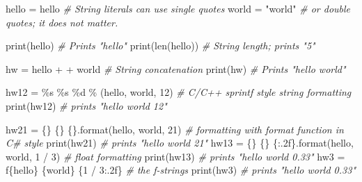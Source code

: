 \documentclass[
]{article}
\newenvironment{Shaded}{}{}
\newcommand{\BuiltInTok}[1]{#1}
\newcommand{\CommentTok}[1]{\textcolor[rgb]{0.38,0.63,0.69}{\textit{#1}}}
\newcommand{\DecValTok}[1]{\textcolor[rgb]{0.25,0.63,0.44}{#1}}
\newcommand{\NormalTok}[1]{#1}
\newcommand{\OperatorTok}[1]{\textcolor[rgb]{0.40,0.40,0.40}{#1}}
\newcommand{\SpecialCharTok}[1]{\textcolor[rgb]{0.25,0.44,0.63}{#1}}
\newcommand{\SpecialStringTok}[1]{\textcolor[rgb]{0.73,0.40,0.53}{#1}}
\newcommand{\StringTok}[1]{\textcolor[rgb]{0.25,0.44,0.63}{#1}}
\begin{document}
\begin{Shaded}
\begin{Highlighting}[]
\NormalTok{hello }\OperatorTok{=} \StringTok{\textquotesingle{}hello\textquotesingle{}}    \CommentTok{\# String literals can use single quotes}
\NormalTok{world }\OperatorTok{=} \StringTok{"world"}    \CommentTok{\# or double quotes; it does not matter.}

\BuiltInTok{print}\NormalTok{(hello)       }\CommentTok{\# Prints "hello"}
\BuiltInTok{print}\NormalTok{(}\BuiltInTok{len}\NormalTok{(hello))  }\CommentTok{\# String length; prints "5"}

\NormalTok{hw }\OperatorTok{=}\NormalTok{ hello }\OperatorTok{+} \StringTok{\textquotesingle{} \textquotesingle{}} \OperatorTok{+}\NormalTok{ world  }\CommentTok{\# String concatenation}
\BuiltInTok{print}\NormalTok{(hw)                 }\CommentTok{\# Prints "hello world"}

\NormalTok{hw12 }\OperatorTok{=} \StringTok{\textquotesingle{}}\SpecialCharTok{\%s}\StringTok{ }\SpecialCharTok{\%s}\StringTok{ }\SpecialCharTok{\%d}\StringTok{\textquotesingle{}} \OperatorTok{\%}\NormalTok{ (hello, world, }\DecValTok{12}\NormalTok{)  }\CommentTok{\# C/C++ sprintf style string formatting}
\BuiltInTok{print}\NormalTok{(hw12)                             }\CommentTok{\# prints "hello world 12"}

\NormalTok{hw21 }\OperatorTok{=} \StringTok{\textquotesingle{}}\SpecialCharTok{\{\}}\StringTok{ }\SpecialCharTok{\{\}}\StringTok{ }\SpecialCharTok{\{\}}\StringTok{\textquotesingle{}}\NormalTok{.}\BuiltInTok{format}\NormalTok{(hello, world, }\DecValTok{21}\NormalTok{)  }\CommentTok{\# formatting with format function in C\# style}
\BuiltInTok{print}\NormalTok{(hw21)                                 }\CommentTok{\# prints "hello world 21"}
\NormalTok{hw13 }\OperatorTok{=} \StringTok{\textquotesingle{}}\SpecialCharTok{\{\}}\StringTok{ }\SpecialCharTok{\{\}}\StringTok{ }\SpecialCharTok{\{:.2f\}}\StringTok{\textquotesingle{}}\NormalTok{.}\BuiltInTok{format}\NormalTok{(hello, world, }\DecValTok{1} \OperatorTok{/} \DecValTok{3}\NormalTok{)  }\CommentTok{\# float formatting}
\BuiltInTok{print}\NormalTok{(hw13)                                        }\CommentTok{\# prints "hello world 0.33"}
\NormalTok{hw3 }\OperatorTok{=} \SpecialStringTok{f\textquotesingle{}}\SpecialCharTok{\{}\NormalTok{hello}\SpecialCharTok{\}}\SpecialStringTok{ }\SpecialCharTok{\{}\NormalTok{world}\SpecialCharTok{\}}\SpecialStringTok{ }\SpecialCharTok{\{}\DecValTok{1} \OperatorTok{/} \DecValTok{3}\SpecialCharTok{:.2f\}}\SpecialStringTok{\textquotesingle{}} \CommentTok{\# the f{-}strings}
\BuiltInTok{print}\NormalTok{(hw3)                           }\CommentTok{\# prints "hello world 0.33"}
\end{Highlighting}
\end{Shaded}
\end{document}
